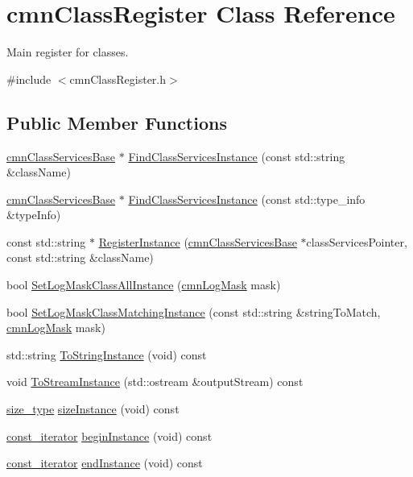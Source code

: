 \hypertarget{classcmn_class_register}{\section{cmn\-Class\-Register Class Reference}
\label{classcmn_class_register}
}


Main register for classes.  




{\ttfamily \#include $<$cmn\-Class\-Register.\-h$>$}

\subsection*{Public Member Functions}
\begin{DoxyCompactItemize}
\item 
\hyperlink{classcmn_class_services_base}{cmn\-Class\-Services\-Base} $\ast$ \hyperlink{classcmn_class_register_a371f6f08b984969a6baf01405fe64301}{Find\-Class\-Services\-Instance} (const std\-::string \&class\-Name)
\item 
\hyperlink{classcmn_class_services_base}{cmn\-Class\-Services\-Base} $\ast$ \hyperlink{classcmn_class_register_a292c354f15d6308ec8ca7a8ca5393a48}{Find\-Class\-Services\-Instance} (const std\-::type\-\_\-info \&type\-Info)
\item 
const std\-::string $\ast$ \hyperlink{classcmn_class_register_a99073eb83fbe6d43abf70a8d00ad82e2}{Register\-Instance} (\hyperlink{classcmn_class_services_base}{cmn\-Class\-Services\-Base} $\ast$class\-Services\-Pointer, const std\-::string \&class\-Name)
\item 
bool \hyperlink{classcmn_class_register_afb45f0c62c3ae291136b54946d804d84}{Set\-Log\-Mask\-Class\-All\-Instance} (\hyperlink{cmn_log_lo_d_8h_a44b6ef7560b0d204460b0a54f1a5d702}{cmn\-Log\-Mask} mask)
\item 
bool \hyperlink{classcmn_class_register_a53cf9c570bc4a85a5e556702e07fa41d}{Set\-Log\-Mask\-Class\-Matching\-Instance} (const std\-::string \&string\-To\-Match, \hyperlink{cmn_log_lo_d_8h_a44b6ef7560b0d204460b0a54f1a5d702}{cmn\-Log\-Mask} mask)
\item 
std\-::string \hyperlink{classcmn_class_register_a25fde8d61752440d7d643e56173f2a7b}{To\-String\-Instance} (void) const 
\item 
void \hyperlink{classcmn_class_register_a8fc3ce4e51acecb0dc1192e1f805da1f}{To\-Stream\-Instance} (std\-::ostream \&output\-Stream) const 
\item 
\hyperlink{classcmn_class_register_ac90771194c85a9fff753d9d623071b01}{size\-\_\-type} \hyperlink{classcmn_class_register_a56096ffe39a5a4eee0ce6d8bf015184f}{size\-Instance} (void) const 
\item 
\hyperlink{classcmn_class_register_aacfef62640c83b00064eba6c1f667e26}{const\-\_\-iterator} \hyperlink{classcmn_class_register_ae18fd6eeb8f39168624bbc50a7c88e43}{begin\-Instance} (void) const 
\item 
\hyperlink{classcmn_class_register_aacfef62640c83b00064eba6c1f667e26}{const\-\_\-iterator} \hyperlink{classcmn_class_register_abaa15f6524d4c6ca44cadb161a2f14bf}{end\-Instance} (void) const 
\end{DoxyCompactItemize}
